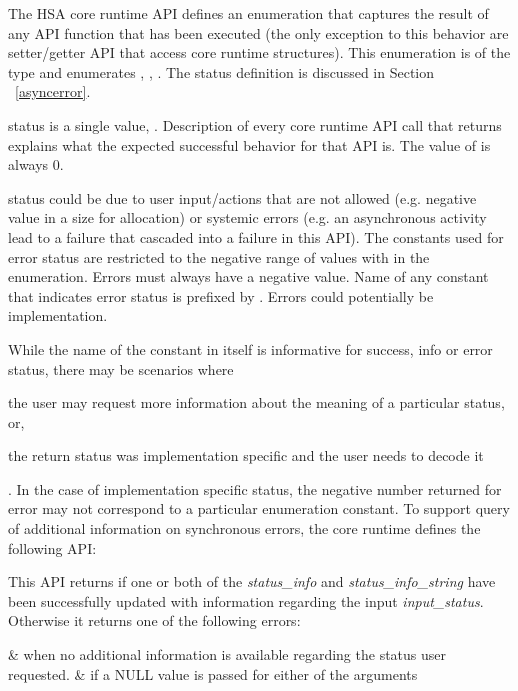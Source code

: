 The HSA core runtime API defines an enumeration that captures the
result of any API function that has been executed (the only
exception to this behavior are setter/getter API that access core
runtime structures). This enumeration is of the type
 and enumerates ,
, . The  status definition
is discussed in Section ~\ref{asyncerror}.

 status is a single value,
.  Description of every core runtime
API call that returns  explains what the
expected successful behavior for that API is. The value of
 is always 0.

 status could be due to user input/actions that are not
allowed (e.g. negative value in a size for allocation) or systemic
errors (e.g. an asynchronous activity lead to a failure that
cascaded into a failure in this API).  The constants used for error
status are restricted to the negative range of values with in the
 enumeration.  Errors must always have a
negative value. Name of any constant that indicates error status is
prefixed by . Errors could potentially be 
implementation.

While the name of the constant in itself is informative for success,
info or error status, there may be scenarios where
\begin{inparaenum}[(i)] \item the user may request more information
about the meaning of a particular status, or, \item the return
status was implementation specific and the user needs to decode it
\end{inparaenum}. In the case of implementation specific status, the
negative number returned for error may not correspond to a
particular enumeration constant. To support query of additional
information on synchronous errors, the core runtime defines the
following API:



This API returns  if one or both of the
{\itshape status\_info} and {\itshape status\_info\_string} have been 
successfully updated with information regarding the input
{\itshape input\_status}. Otherwise it returns one of the following errors:

\begin{easylist}
&  when no additional information is
available regarding the status user requested. 
&  if a NULL value is
passed for either of the arguments
\end{easylist}

